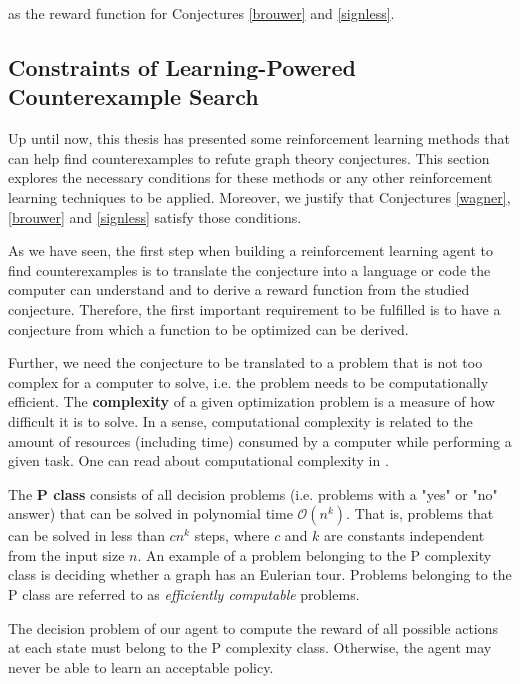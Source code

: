 \documentclass[11pt]{article}
\theoremstyle{definition}
\begin{document}
as the reward function for Conjectures \ref{brouwer} and \ref{signless}.

\subsection{Constraints of Learning-Powered Counterexample Search} \label{constraints}

%

Up until now, this thesis has presented some reinforcement learning methods that can help find counterexamples to refute graph theory conjectures. This section explores the necessary conditions for these  methods or any other reinforcement learning techniques to be applied. Moreover, we justify that Conjectures \ref{wagner}, \ref{brouwer} and \ref{signless} satisfy those conditions.

As we have seen, the first step when building a reinforcement learning agent to find counterexamples is to translate the conjecture into a language or code the computer can understand and to derive a reward function from the studied conjecture. Therefore, the first important requirement to be fulfilled is to have a conjecture from which a function to be optimized can be derived. 

Further, we need the conjecture to be translated to a problem that is not too complex for a computer to solve, i.e. the problem needs to be computationally efficient. The \textbf{complexity} of a given optimization problem is a measure of how difficult it is to solve. In a sense, computational complexity is related to the amount of resources (including time) consumed by a computer while performing a given task. One can read about computational complexity in \cite{AroraBarak, Burgisser}.

The \textbf{P class} consists of all decision problems (i.e. problems with a "yes" or "no" answer) that can be solved in polynomial time $\mathcal{O}(n^k)$. That is, problems that can be solved in less than $cn^k$ steps, where $c$ and $k$ are constants independent from the input size $n$. An example of a problem belonging to the P complexity class is deciding whether a graph has an Eulerian tour. Problems belonging to the P class are referred to as \textit{efficiently computable} problems.

The decision problem of our agent to compute the reward of all possible actions at each state must belong to the P complexity class. Otherwise, the agent may never be able to learn an acceptable policy. 
\end{document}
